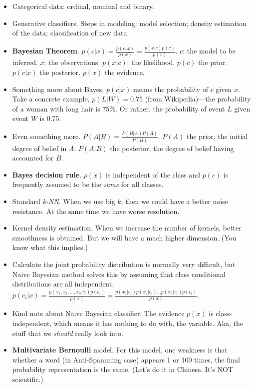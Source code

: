 \documentclass[twocolumn]{article}
\begin{document}
\begin{itemize}
\item Categorical data: ordinal, nominal and binary.
\item Generative classifiers. Steps in modeling: model selection;
  density estimation of the data; classification of new data.
\item \textbf{Bayesian
    Theorem}. $p(c|x)=\frac{p(c,x)}{p(x)}=\frac{p(x|c)p(c)}{p(x)}$. $c$:
  the model to be inferred.  $x$: the observations. $p(x|c)$: the
  likelihood. $p(c)$ the prior. $p(c|x)$ the posterior. $p(x)$ the
  evidence.
\item Something more about Bayes. $p(c|x)$ means the probability of
  $c$ given $x$. Take a concrete example. $p(L|W)=0.75$ (from
  Wikipedia)---the probability of a woman with long hair is $75\%$. Or
  rather, the probability of event $L$ given event $W$ is $0.75$.
\item Even something more. $P(A|B)=\frac{P(B|A)P(A)}{P(B)}$. $P(A)$
  the prior, the initial degree of belief in $A$. $P(A|B)$ the
  posterior, the degree of belief having accounted for $B$.
\item \textbf{Bayes decision rule}. $p(x)$ is independent of the class
  and $p(c)$ is frequently assumed to be the \emph{same} for all
  classes.
\item Standard \emph{k-NN}. When we use big $k$, then we could have a
  better noise resistance. At the same time we have worse resolution.
\item Kernel density estimation. When we increase the number of
  kernels, better smoothness is obtained. But we will have a much
  higher dimension. (You know what this implies.)
\item Calculate the joint probability distribution is normally very
  difficult, but Naive Bayesian method solves this by assuming that
  class conditional distributions are all
  independent. $p(c_{i}|x)=\frac{p(x_{1},x_{2},\ldots,x_{n}|c_{i})p(c_{i})}{p(x)}=\frac{p(x_{1}|c_{i})p(x_{2}|c_{i})\ldots
    p(x_{n}|c_{i})p(c_{i})}{p(x)}$.
\item Kind note about Naive Bayesian classifier. The evidence $p(x)$
  is class-independent, which means it has nothing to do with, the
  variable. Aka, the stuff that we \emph{should} really look into.
\item \textbf{Multivariate Bernoulli} model. For this model, one
  weakness is that whether a word (in Anti-Spamming case) appears 1 or
  100 times, the final probability representation is the same. (Let's
  do it in Chinese. It's NOT scientific.) 

\end{itemize}
\end{document}
